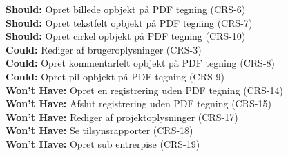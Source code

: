 \textbf{Should:} Opret billede opbjekt på PDF tegning (CRS-6) \\
\textbf{Should:} Opret tekstfelt opbjekt på PDF tegning (CRS-7) \\
\textbf{Should:} Opret cirkel opbjekt på PDF tegning (CRS-10) \\

\textbf{Could:} Rediger af brugeroplysninger (CRS-3) \\
\textbf{Could:} Opret kommentarfelt opbjekt på PDF tegning (CRS-8) \\
\textbf{Could:} Opret pil opbjekt på PDF tegning (CRS-9) \\

\textbf{Won't Have:} Opret en registrering uden PDF tegning (CRS-14) \\
\textbf{Won't Have:} Afslut registrering uden PDF tegning (CRS-15) \\
\textbf{Won't Have:} Rediger af projektoplysninger (CRS-17) \\
\textbf{Won't Have:} Se tilsynsrapporter (CRS-18) \\
\textbf{Won't Have:} Opret sub entrerpise (CRS-19)



